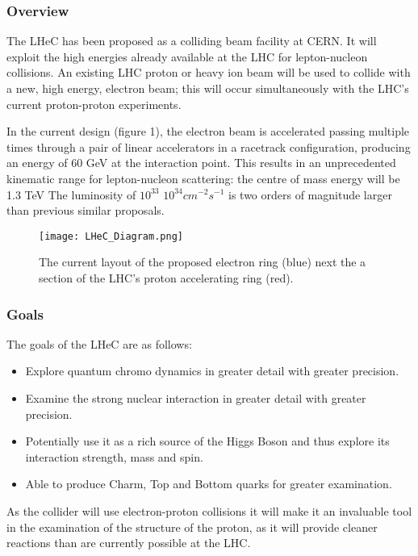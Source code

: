 \subsubsection{Overview \cite{LHeC:Birmingham}}

The LHeC has been proposed as a colliding beam facility at CERN. It will exploit the high energies already available at the LHC for lepton-nucleon collisions. An existing LHC proton or heavy ion beam will be used to collide with a new, high energy, electron beam; this will occur simultaneously with the LHC’s current proton-proton experiments.
 
In the current design (figure 1), the electron beam is accelerated passing multiple times through a pair of linear accelerators in a racetrack configuration, producing an energy of 60 GeV at the interaction point. This results in an unprecedented kinematic range for lepton-nucleon scattering: the centre of mass energy will be 1.3 TeV The luminosity of $10^{33}$ \textemdash $10^{34} cm^{-2}s^{-1}$ is two orders of magnitude larger than previous similar proposals.

\begin{figure}[!htb]
\centering
\texttt{[image: LHeC\_Diagram.png]}
\caption{The current layout of the proposed electron ring (blue) next the a section of the LHC’s proton accelerating ring (red).
}
\end{figure}

\subsubsection{Goals}

The goals of the LHeC are as follows:
\begin{itemize}
\item Explore quantum chromo dynamics in greater detail with greater precision.
\item Examine the strong nuclear interaction in greater detail with greater precision.
\item Potentially use it as a rich source of the Higgs Boson and thus explore its interaction strength, mass and spin.
\item Able to produce Charm, Top and Bottom quarks for greater examination.
\end{itemize}
As the collider will use electron-proton collisions it will make it an invaluable tool in the examination of the structure of the proton, as it will provide cleaner reactions than are currently possible at the LHC.
 
